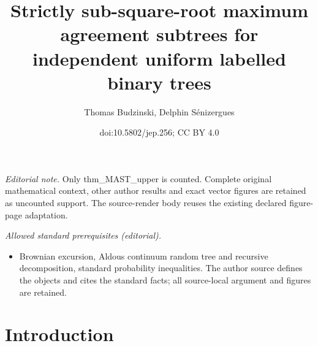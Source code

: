 \documentclass[11pt]{article}
\title{Strictly sub-square-root maximum agreement subtrees for independent uniform labelled binary trees}
\author{Thomas Budzinski, Delphin Sénizergues}
\date{doi:10.5802/jep.256; CC BY 4.0}
\theoremstyle{plain}
\theoremstyle{definition}
\numberwithin{equation}{section}
\begin{document}
\maketitle
\noindent\textit{Editorial note.} Only thm\_MAST\_upper is counted. Complete original mathematical context, other author results and exact vector figures are retained as uncounted support. The source-render body reuses the existing declared figure-page adaptation.\par\medskip
\noindent\textit{Allowed standard prerequisites (editorial).}\begin{itemize}
\item Brownian excursion, Aldous continuum random tree and recursive decomposition, standard probability inequalities. The author source defines the objects and cites the standard facts; all source-local argument and figures are retained.
\end{itemize}\medskip
\vspace*{-2\baselineskip}\mbox{}
\section{Introduction}
\end{document}
